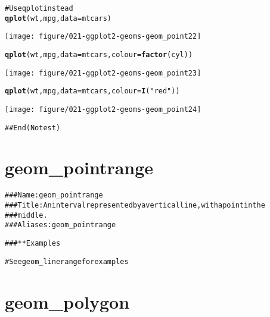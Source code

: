 \documentclass[a4paper,titlepage]{tufte-handout}\usepackage{graphicx, color}
\makeatletter
\def\maxwidth{ %
  \ifdim\Gin@nat@width>\linewidth
    \linewidth
  \else
    \Gin@nat@width
  \fi
}
\newcommand{\hlfunctioncall}[1]{\textcolor[rgb]{0.501960784313725,0,0.329411764705882}{\textbf{#1}}}%
\newcommand{\hlstring}[1]{\textcolor[rgb]{0.6,0.6,1}{#1}}%
\newcommand{\hlcomment}[1]{\textcolor[rgb]{0.180392156862745,0.6,0.341176470588235}{#1}}%
\newenvironment{kframe}{%
 \def\at@end@of@kframe{}%
 \ifinner\ifhmode%
  \def\at@end@of@kframe{\end{minipage}}%
  \begin{minipage}{\columnwidth}%
 \fi\fi%
 \def\FrameCommand##1{\hskip\@totalleftmargin \hskip-\fboxsep
 \colorbox{shadecolor}{##1}\hskip-\fboxsep
     \hskip-\linewidth \hskip-\@totalleftmargin \hskip\columnwidth}%
 \MakeFramed {\advance\hsize-\width
   \@totalleftmargin\z@ \linewidth\hsize
   \@setminipage}}%
 {\par\unskip\endMakeFramed%
 \at@end@of@kframe}
\newenvironment{knitrout}{}{} %
\makeatother
\begin{document}
\begin{knitrout}
\begin{kframe}
\begin{alltt}
\hlcomment{# Use qplot instead}
\hlfunctioncall{qplot}(wt, mpg, data = mtcars)
\end{alltt}
\end{kframe}
\texttt{[image: figure/021-ggplot2-geoms-geom\_point22]} 
\begin{kframe}\begin{alltt}
\hlfunctioncall{qplot}(wt, mpg, data = mtcars, colour = \hlfunctioncall{factor}(cyl))
\end{alltt}
\end{kframe}
\texttt{[image: figure/021-ggplot2-geoms-geom\_point23]} 
\begin{kframe}\begin{alltt}
\hlfunctioncall{qplot}(wt, mpg, data = mtcars, colour = \hlfunctioncall{I}(\hlstring{"red"}))
\end{alltt}
\end{kframe}
\texttt{[image: figure/021-ggplot2-geoms-geom\_point24]} 
\begin{kframe}\begin{alltt}
\hlcomment{## End(No test)}


\end{alltt}
\end{kframe}
\end{knitrout}



\section{geom\_pointrange}

\begin{knitrout}
\color{fgcolor}\begin{kframe}
\begin{alltt}
\hlcomment{### Name: geom_pointrange}
\hlcomment{### Title: An interval represented by a vertical line, with a point in the}
\hlcomment{###   middle.}
\hlcomment{### Aliases: geom_pointrange}

\hlcomment{### ** Examples}

\hlcomment{# See geom_linerange for examples}



\end{alltt}
\end{kframe}
\end{knitrout}



\section{geom\_polygon}
\end{document}
